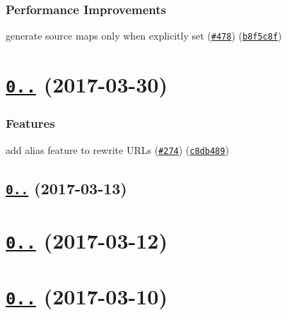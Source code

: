 \subsubsection*{Performance Improvements}


\begin{DoxyItemize}
\item generate source maps only when explicitly set (\href{https://github.com/webpack/css-loader/issues/478}{\tt \#478}) (\href{https://github.com/webpack/css-loader/commit/b8f5c8f}{\tt b8f5c8f})
\end{DoxyItemize}

\label{_0.28.0}%
 \section*{\href{https://github.com/webpack/css-loader/compare/v0.27.3...v0.28.0}{\tt 0..} (2017-\/03-\/30)}

\subsubsection*{Features}


\begin{DoxyItemize}
\item add alias feature to rewrite U\+R\+Ls (\href{https://github.com/webpack/css-loader/issues/274}{\tt \#274}) (\href{https://github.com/webpack/css-loader/commit/c8db489}{\tt c8db489})
\end{DoxyItemize}

\label{_0.27.3}%
 \subsection*{\href{https://github.com/webpack/css-loader/compare/v0.27.2...v0.27.3}{\tt 0..} (2017-\/03-\/13)}

\label{_0.27.2}%
 \section*{\href{https://github.com/webpack/css-loader/compare/v0.27.1...v0.27.2}{\tt 0..} (2017-\/03-\/12)}

\label{_0.27.1}%
 \section*{\href{https://github.com/webpack/css-loader/compare/v0.27.0...v0.27.1}{\tt 0..} (2017-\/03-\/10)}

\label{_0.27.0}%
